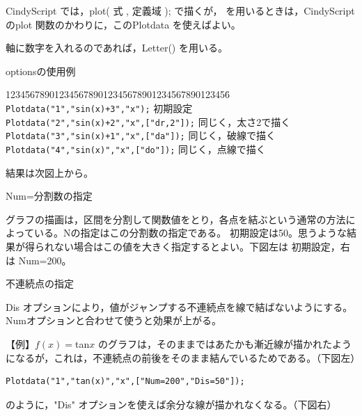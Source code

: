 \documentclass[papersize,a4paper,12pt,uplatex]{jsarticle}
\begin{document}
\begin{description}
CindyScript では，plot( 式 , 定義域 ); で描くが， \ketcindy を用いるときは，CindyScript のplot 関数のかわりに，このPlotdata を使えばよい。

軸に数字を入れるのであれば，Letter() を用いる。

\vspace{\baselineskip}
optionsの使用例
\begin{tabbing}
1234\=567890123456789012345678901234567890123456\=\kill
 \> \verb|Plotdata("1","sin(x)+3","x");| \> 初期設定\\
 \> \verb|Plotdata("2","sin(x)+2","x",["dr,2"]);| \> 同じく，太さ2で描く\\
 \> \verb|Plotdata("3","sin(x)+1","x",["da"]);|\> 同じく，破線で描く\\
 \> \verb|Plotdata("4","sin(x)","x",["do"]);|\> 同じく，点線で描く
 \end{tabbing}
結果は次図上から。

\vspace{\baselineskip}
\hspace{20mm} \scalebox{0.9}{} 

Num=分割数の指定

グラフの描画は，区間を分割して関数値をとり，各点を結ぶという通常の方法によっている。Nの指定はこの分割数の指定である。 初期設定は50。思うような結果が得られない場合はこの値を大きく指定するとよい。下図左は 初期設定，右は Num=200。

\vspace{\baselineskip}
\hspace{20mm}\scalebox{0.8}{ }

不連続点の指定

Dis オプションにより，値がジャンプする不連続点を線で結ばないようにする。Numオプションと合わせて使うと効果が上がる。

\vspace{\baselineskip}
【例】$f(x)=$tan$x$ のグラフは，そのままではあたかも漸近線が描かれたようになるが，これは，不連続点の前後をそのまま結んでいるためである。（下図左）
\begin{verbatim}
Plotdata("1","tan(x)","x",["Num=200","Dis=50"]);
\end{verbatim}
のように，"Dis" オプションを使えば余分な線が描かれなくなる。（下図右）

\vspace{\baselineskip}
\hspace{20mm} \hspace{20mm}  


\end{description}
\end{document}
